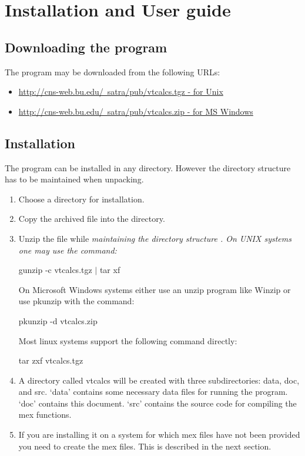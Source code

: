 \chapter{Installation and User guide}

\section{Downloading the program}
The program may be downloaded from the following URLs:
\begin{itemize}
\item \href{http://cns-web.bu.edu/~satra/pub/vtcalcs.tgz}
{http://cns-web.bu.edu/~satra/pub/vtcalcs.tgz - for Unix}
\item \href{http://cns-web.bu.edu/~satra/pub/vtcalcs.zip}
{http://cns-web.bu.edu/~satra/pub/vtcalcs.zip - for MS Windows}
\end{itemize}

\section{Installation}
The program can be installed in any directory. However the
directory structure has to be maintained when unpacking.

\begin{enumerate}
\item Choose a directory for installation.
\item Copy the archived file into the directory.
\item Unzip the file while \em maintaining the directory structure \em. On
UNIX systems one may use the command: \begin{center} gunzip -c
vtcalcs.tgz $|$ tar xf \end{center}  On Microsoft Windows systems
either use an unzip program like Winzip or use pkunzip with the
command:
\begin{center} pkunzip -d vtcalcs.zip
\end{center} Most linux systems support the following command
directly:
\begin{center} tar zxf vtcalcs.tgz \end{center}
\item A directory called vtcalcs will be created with three
subdirectories: data, doc, and src. `data' contains some necessary
data files for running the program. `doc' contains this document.
`src' contains the source code for compiling the mex functions.
\item If you are installing it on a system for which mex files
have not been provided you need to create the mex files. This is
described in the next section.
\end{enumerate}

